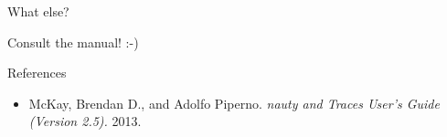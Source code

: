 \documentclass{beamer}
\begin{document}

\begin{frame}[fragile] {What else?}
{}

Consult the manual! :-)

\end{frame}


\begin{frame}{References}

\begin{itemize}
\item
McKay, Brendan D., and Adolfo Piperno. \emph{nauty and Traces User's Guide (Version 2.5).} 2013.
\end{itemize}
\end{frame}

\end{document}
